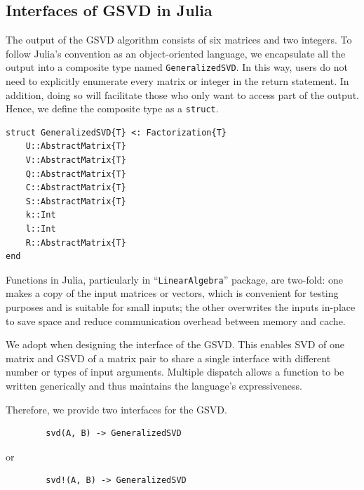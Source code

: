 \subsection{Interfaces of GSVD in Julia}

The output of the GSVD algorithm consists of six matrices and two integers. 
To follow Julia's convention as an object-oriented language, we encapsulate 
all the output into a composite type named \texttt{GeneralizedSVD}. 
In this way, users do not need to explicitly enumerate every matrix 
or integer in the return statement. In addition, doing so will facilitate 
those who only want to access part of the output. 
Hence, we define the composite type as a {\tt struct}. 

\begin{verbatim} 
struct GeneralizedSVD{T} <: Factorization{T}
    U::AbstractMatrix{T}
    V::AbstractMatrix{T}
    Q::AbstractMatrix{T}
    C::AbstractMatrix{T}
    S::AbstractMatrix{T}
    k::Int
    l::Int
    R::AbstractMatrix{T}
end
\end{verbatim} 

Functions in Julia, particularly in ``\texttt{LinearAlgebra}'' package, 
are two-fold: one makes a copy of the input matrices or vectors, which
is convenient for testing purposes and is suitable for small inputs; 
the other overwrites the inputs in-place to save space and reduce communication overhead
between memory and cache. 

We adopt  when designing the interface 
of the GSVD. This enables SVD of one matrix and GSVD of a matrix pair 
to share a single interface with different number or types of 
input arguments. Multiple dispatch allows a function to be written 
generically and thus maintains the language's expressiveness. 

\bigskip

Therefore, we provide two interfaces for the GSVD.  
\begin{verbatim} 
        svd(A, B) -> GeneralizedSVD
\end{verbatim} 
or
\begin{verbatim} 
        svd!(A, B) -> GeneralizedSVD
\end{verbatim} 



